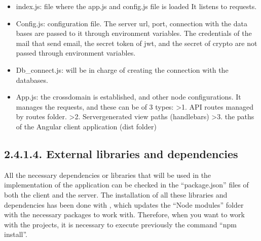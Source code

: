\documentclass[letterpaper,10pt,english]{sphinxmanual}
\begin{document}
\begin{itemize}
\item {} 
index.js: file where the app.js and config.js file is loaded It listens to requests.

\item {} 
Config.js: configuration file. The server url, port, connection with the data bases are passed to it through environment variables. The credentials of the mail that send email, the secret token of jwt, and the secret of crypto are not passed through environment variables.

\item {} 
Db\_connect.js: will be in charge of creating the connection with the databases.

\item {} 
App.js: the crossdomain is established, and other node configurations. It manages the requests, and these can be of 3 types:
\textgreater{}1. API routes managed by routes folder.
\textgreater{}2. Server\sphinxhyphen{}generated view paths (handlebars)
\textgreater{}3. the paths of the Angular client application (dist folder)

\end{itemize}


\subsection{2.4.1.4. External libraries and dependencies}
\label{\detokenize{pages/SW/Code:external-libraries-and-dependencies}}
All the necessary dependencies or libraries that will be used in the implementation of the application can be checked in the “package.json” files of both the client and the server. The installation of all these libraries and dependencies has been done with , which updates the “Node modules” folder with the necessary packages to work with. Therefore, when you want to work with the projects, it is necessary to execute previously the command “npm install”.
\end{document}
